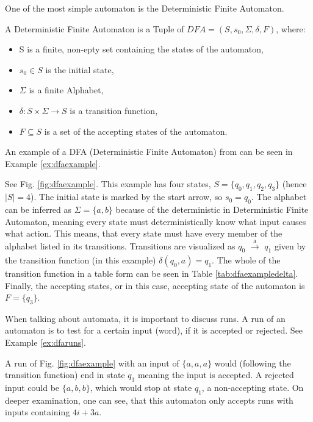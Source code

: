 One of the most simple automaton is the Deterministic Finite Automaton.

\begin{definition}
	A Deterministic Finite Automaton is a Tuple of $ DFA=(S,s_{0},\Sigma,\delta,F) $, where: 
	\begin{itemize}
		\item S is a finite, non-epty set containing the states of the automaton,
		\item $s_{0} \in S$ is the initial state,
		\item $\Sigma$ is a finite Alphabet,
		\item $\delta: S\times \Sigma \to S$ is a transition function,
		\item $F\subseteq S$ is a set of the accepting states of the automaton. 
	\end{itemize}
\end{definition}


An example of a DFA (Deterministic Finite Automaton) from\cite{Steffen2011} can be seen in Example \ref{ex:dfaexample}.

\begin{example}
	\label{ex:dfaexample}
	See Fig. \ref{fig:dfaexample}. This example has four states, $S = \{q_0, q_1, q_2, q_3\}$ (hence $|S| = 4$). The initial state is marked by the start arrow, so $s_0 = q_0$. The alphabet can be inferred as $\Sigma = \{a, b\}$ because of the deterministic in Deterministic Finite Automaton, meaning every state must deterministically know what input causes what action. This means, that every state must have every member of the alphabet listed in its transitions. Transitions are visualized as $q_0$ $\xrightarrow[]{\text{a}}$ $q_1$ given by the transition function (in this example) $\delta(q_0, a) = q_1$. The whole of the transition function in a table form can be seen in Table \ref{tab:dfaexampledelta}. Finally, the accepting states, or in this case, accepting state of the automaton is $F = \{q_3\}$.
\end{example}
 

When talking about automata, it is important to discuss runs. A run of an automaton is to test for a certain input (word), if it is accepted or rejected. See Example \ref{ex:dfaruns}.

\begin{example}
	\label{ex:dfaruns}
	A run of Fig. \ref{fig:dfaexample} with an input of $\{a, a, a\}$ would (following the transition function) end in state $q_3$ meaning the input is accepted. A rejected input could be $\{a, b, b\}$, which would stop at state $q_1$, a non-accepting state. On deeper examination, one can see, that this automaton only accepts runs with inputs containing $4i+3 a$.
\end{example}

